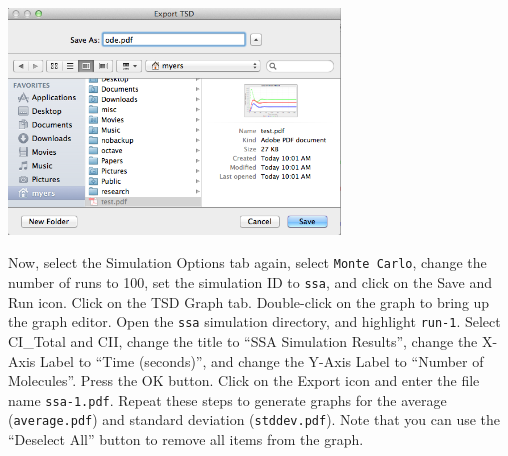 \documentclass[titlepage,11pt]{article}
\begin{document}
\begin{center}
\includegraphics[height=60mm]{screenshots/exportTSD}
\end{center}

Now, select the Simulation Options tab again, select {\tt Monte Carlo}, change the number of runs to 100, set the simulation ID to {\tt ssa}, and click on the Save and Run icon.  Click on the TSD Graph tab.  Double-click on the graph to bring up the graph editor.  Open the {\tt ssa} simulation directory, and highlight {\tt run-1}.  Select CI\_Total and CII, change the title to ``SSA Simulation Results'', change the X-Axis Label to ``Time (seconds)'', and change the Y-Axis Label to ``Number of Molecules''.  Press the OK button.  Click on the Export icon and enter the file name {\tt ssa-1.pdf}.  Repeat these steps to generate graphs for the average ({\tt average.pdf}) and standard deviation ({\tt stddev.pdf}).  Note that you can use the ``Deselect All'' button to remove all items from the graph.
\end{document}
